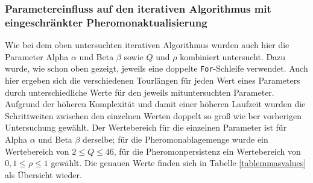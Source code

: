 \documentclass[doktyp=barbeit, sprache=german]{TUBAFarbeiten}
\begin{document}
\subsubsection{Parametereinfluss auf den iterativen Algorithmus mit eingeschränkter Pheromonaktualisierung}
Wie bei dem oben untersuchten iterativen Algorithmus wurden auch hier die Parameter Alpha $\alpha$ und Beta $\beta$ sowie $Q$ und $\rho$ kombiniert untersucht. Dazu wurde, wie schon oben gezeigt, jeweils eine doppelte \texttt{For}-Schleife verwendet. Auch hier ergeben sich die verschiedenen Tourlängen für jeden Wert eines Parameters durch unterschiedliche Werte für den jeweils mituntersuchten Parameter. Aufgrund der höheren Komplexität und damit einer höheren Laufzeit wurden die Schrittweiten zwischen den einzelnen Werten doppelt so groß wie ber vorherigen Untersuchung gewählt. Der Wertebereich für die einzelnen Parameter ist für Alpha $\alpha$ und Beta $\beta$ derselbe; für die Pheromonablagemenge wurde ein Wertebereich von $2 \leq Q \leq 46$, für die Pheromonpersistenz ein Wertebereich von $0,1 \leq \rho \leq 1$ gewählt. Die genauen Werte finden sich in Tabelle \ref{tablemmasvalues} als Übersicht wieder.
\begin{table}[]
\centering
{}
\caption[Übersicht über die Parameterwerte für die Untersuchung der Abhängigkeit der einzelnen Parameter bei Betrachtung des iterativen Algorithmus mit eingeschränkter Pheromonaktualisierung zur Tourkonstruktion]{Übersicht über die Parameterwerte für die Untersuchung der Abhängigkeit der Tourlänge von den einzelnen Parameter bei Betrachtung des iterativen Algorithmus mit eingeschränkter Pheromonaktualisierung zur Tourkonstruktion. Die Spalte \glqq Parameterwert bei Untersuchung der anderen Parameter\grqq\, gibt an, welche Werte für Alpha $\alpha$ und Beta $\beta$ bei Untersuchung der Pheromonablagemenge und der Pheromonpersistenz gewählt wurden und umgekehrt.}
\label{tablemmasvalues}
\end{table}
\end{document}
